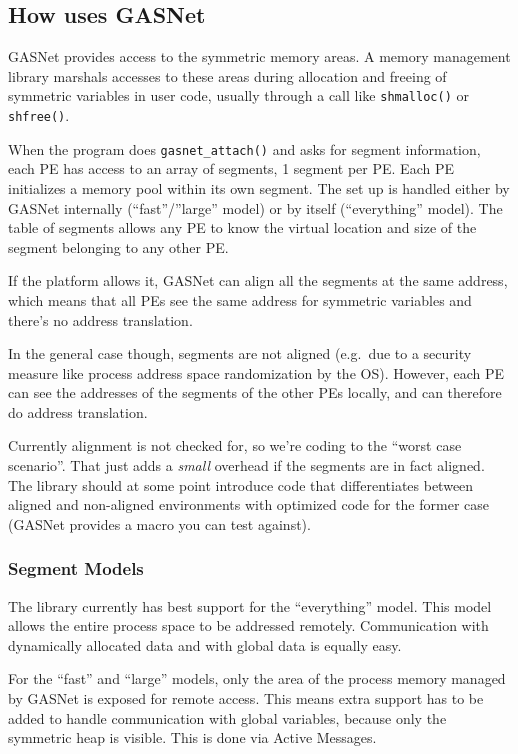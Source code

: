 \subsection{How \openshmem uses GASNet}

GASNet provides access to the symmetric memory areas. A memory
management library marshals accesses to these areas during allocation
and freeing of symmetric variables in user code, usually through a
call like \texttt{shmalloc()} or \texttt{shfree()}.

When the program does \texttt{gasnet\_attach()} and asks for segment
information, each PE has access to an array of segments, 1 segment
per PE. Each PE initializes a memory pool within its own segment.
The set up is handled either by GASNet internally (``fast''/''large''
model) or by \openshmem itself (``everything'' model). The table of
segments allows any PE to know the virtual location and size of the
segment belonging to any other PE.

If the platform allows it, GASNet can align all the segments at the
same address, which means that all PEs see the same address for
symmetric variables and there's no address translation.

In the general case though, segments are not aligned (e.g.\ due to a
security measure like process address space randomization by the
OS). However, each PE can see the addresses of the segments of the
other PEs locally, and can therefore do address translation.

Currently alignment is not checked for, so we're coding to the
``worst case scenario''. That just adds a \emph{small} overhead if
the segments are in fact aligned. The library should at some point
introduce code that differentiates between aligned and non-aligned
environments with optimized code for the former case (GASNet provides
a macro you can test against).

\subsubsection{Segment Models}

The library currently has best support for the ``everything''
model. This model allows the entire process space to be addressed
remotely. Communication with dynamically allocated data and with
global data is equally easy.

For the ``fast'' and ``large'' models, only the area of the process
memory managed by GASNet is exposed for remote access. This means
extra support has to be added to handle communication with global
variables, because only the symmetric heap is visible.
This is done via Active Messages.

